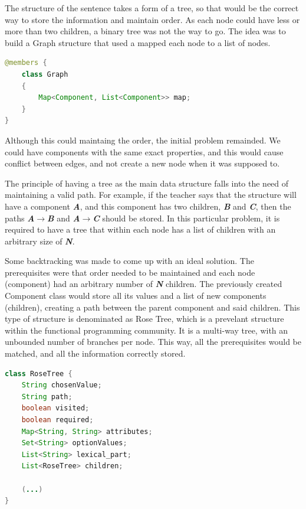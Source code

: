 The structure of the sentence takes a form of a tree, so that would be the correct way to store the information and maintain order. As each node could have less or more 
than two children, a binary tree was not the way to go. The idea was to build a Graph structure that used a mapped each node to a list of nodes.

\begin{center}
\begin{minipage}{11cm}
\begin{lstlisting}[language=java, basicstyle=\small, label={lst:graph_class}, caption=Graph class]
@members {
    class Graph
    {
        Map<Component, List<Component>> map;
    }
}
\end{lstlisting}
\end{minipage}
\end{center}

Although this could maintaing the order, the initial problem remainded. We could have components with the same exact properties, and this would cause conflict between
edges, and not create a new node when it was supposed to.

The principle of having a tree as the main data structure falls into the need of maintaining a valid path. For example, if the teacher says that the structure will have a component \emph{\textbf{A}}, and this component has two children, \emph{\textbf{B}} and \emph{\textbf{C}}, then the paths \emph{\textbf{A$\rightarrow$B}} and \emph{\textbf{A$\rightarrow$C}} should be stored. In this particular problem, it is required to have a tree that within each node has a list of children with an arbitrary size of \emph{\textbf{N}}.

Some backtracking was made to come up with an ideal solution. The prerequisites were that order needed to be maintained and each node (component) had an arbitrary number
of \emph{\textbf{N}} children. The previously created Component class would store all its values and a list of new components (children), creating a path between 
the parent component and said children. This type of structure is denominated as Rose Tree, which is a prevelant structure within the functional programming community. 
It is a multi-way tree, with an unbounded number of branches per node. This way, all the prerequisites would be matched, and all the information correctly stored. 

\begin{center}
\begin{minipage}{10cm}
\begin{lstlisting}[language=java, basicstyle=\small, label={lst:rosetree_class}, caption=RoseTree class]
class RoseTree {
    String chosenValue;
    String path;
    boolean visited;
    boolean required;
    Map<String, String> attributes;
    Set<String> optionValues;
    List<String> lexical_part;
    List<RoseTree> children;

    (...)
}
\end{lstlisting}
\end{minipage}
\end{center}

